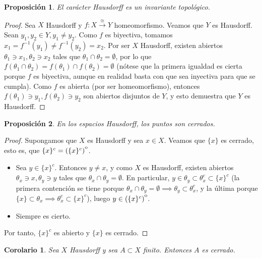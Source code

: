 \documentclass[12pt]{report}
\newtheorem{proposition}{Proposición}[chapter]
\newtheorem{corollary}{Corolario}[chapter]
\theoremstyle{definition}
\theoremstyle{definition}
\theoremstyle{remark}
\begin{document}
\begin{proposition}
\label{prop4.3.}
El carácter Hausdorff es un invariante topológico.
\end{proposition}

\begin{proof}
Sea $X$ Hausdorff y $f \colon X \xrightarrow{\cong} Y$ homeomorfismo. Veamos que $Y$ es Hausdorff. Sean $y_1, y_2 \in Y, y_1 \neq y_2$. Como $f$ es biyectiva, tomamos $x_1 = f^{-1}(y_1) \neq f^{-1}(y_2) = x_2$. Por ser $X$ Hausdorff, existen abiertos $\theta_1 \ni x_1, \theta_2 \ni x_2$ tales que $\theta_1 \cap \theta_2 = \emptyset$, por lo que $f(\theta_1 \cap \theta_2) = f(\theta_1) \cap f(\theta_2) = \emptyset$ (nótese que la primera igualdad es cierta porque $f$ es biyectiva, aunque en realidad basta con que sea inyectiva para que se cumpla). Como $f$ es abierta (por ser homeomorfismo), entonces $f(\theta_1) \ni y_1, f(\theta_2) \ni y_2$ son abiertos disjuntos de $Y$, y esto demuestra que $Y$ es Hausdorff.
\end{proof}

\begin{proposition}
\label{prop4.4.}
En los espacios Hausdorff, los puntos son cerrados.
\end{proposition}

\begin{proof}
Supongamos que $X$ es Hausdorff y sea $x \in X$. Veamos que $\{x\}$ es cerrado, esto es, que $\{x\}^c = (\{x\}^c)\strut^\mathrm{o}$.
\begin{itemize}
    \item[{\fbox[rb]{$\subset$}}] Sea $y \in \{x\}^c$. Entonces $y \neq x$, y como $X$ es Hausdorff, existen abiertos $\theta_x \ni x, \theta_y \ni y$ tales que $\theta_x \cap \theta_y = \emptyset$. En particular, $\displaystyle y \in \theta_y \subset \theta_x^c \subset \{x\}^c$ (la primera contención se tiene porque $\displaystyle \theta_x \cap \theta_y = \emptyset \implies \theta_y \subset \theta_x^c$, y la última porque $\displaystyle \{x\} \subset \theta_x \implies \theta_x^c \subset \{x\}^c$), luego $y \in (\{x\}^c)\strut^\mathrm{o}$.
    \item[{\fbox[rb]{$\supset$}}] Siempre es cierto.
\end{itemize}
Por tanto, $\{x\}^c$ es abierto y $\{x\}$ es cerrado.
\end{proof}

\begin{corollary}
Sea $X$ Hausdorff y sea $A \subset X$ finito. Entonces $A$ es cerrado.
\end{corollary}
\end{document}
